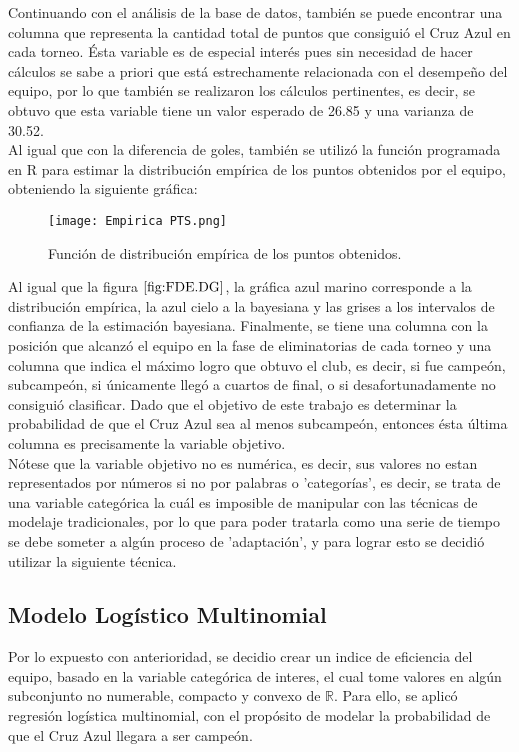 \documentclass{article}
\theoremstyle{remark}
\begin{document}
Continuando con el análisis de la base de datos, también se puede encontrar una columna que representa la cantidad total de puntos que consiguió el Cruz Azul en cada torneo. Ésta variable es de especial interés pues sin necesidad de hacer cálculos se sabe a priori que está estrechamente relacionada con el desempeño del equipo, por lo que también se realizaron los cálculos pertinentes, es decir, se obtuvo que esta variable tiene un valor esperado de 26.85 y una varianza de 30.52.\\

Al igual que con la diferencia de goles, también se utilizó la función programada en R para estimar la distribución empírica de los puntos obtenidos por el equipo, obteniendo la siguiente gráfica:
\begin{figure}[H]
    \centering
    \texttt{[image: Empirica PTS.png]}
    \caption{Función de distribución empírica de los puntos obtenidos.}
    \label{fig:FDE.PTS}
\end{figure}
Al igual que la figura $\ref{fig:FDE.DG}$, la gráfica azul marino corresponde a la distribución empírica, la azul cielo a la bayesiana y las grises a los intervalos de confianza de la estimación bayesiana.
Finalmente, se tiene una columna con la posición que alcanzó el equipo en la fase de eliminatorias de cada torneo y una columna que  indica el máximo logro que obtuvo el club, es decir, si fue campeón, subcampeón, si únicamente llegó a cuartos de final, o si desafortunadamente no consiguió clasificar. Dado que el objetivo de este trabajo es determinar la probabilidad de que el Cruz Azul sea al menos subcampeón, entonces ésta última columna es precisamente la variable objetivo. \\

Nótese que la variable objetivo no es numérica, es decir, sus valores no estan representados por números si no por palabras o 'categorías', es decir, se trata de una variable categórica la cuál es imposible de manipular con las técnicas de modelaje tradicionales, por lo que para poder tratarla como una serie de tiempo se debe someter a algún proceso de 'adaptación',  y para lograr esto se decidió utilizar la siguiente técnica.


\subsection{Modelo Logístico Multinomial}
Por lo expuesto con anterioridad, se decidio crear un indice de eficiencia del equipo, basado en la variable categórica de interes, el cual tome valores en algún subconjunto no numerable, compacto y convexo de \(\mathbb{R}\). Para ello, se aplicó regresión logística multinomial, con el propósito de modelar la probabilidad de que el Cruz Azul llegara a ser campeón.\\
\end{document}
